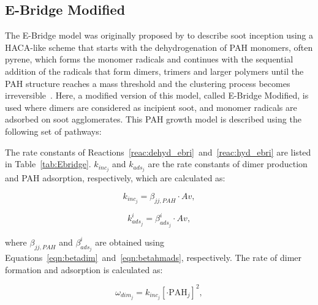 \subsection{E-Bridge Modified}
\label{sec:ebrimod}
The E-Bridge model was originally proposed by \citet{frenklach2020mechanism} to describe soot inception using a HACA-like scheme that starts with the dehydrogenation of PAH monomers, often pyrene, which forms the monomer radicals and continues with the sequential addition of the radicals that form dimers, trimers and larger polymers until the PAH structure reaches a mass threshold and the clustering process becomes irreversible~\citep{frenklach2020mechanism}. Here, a modified version of this model, called E-Bridge Modified, is used where dimers are considered as incipient soot, and monomer radicals are adsorbed on soot agglomerates. This PAH growth model is described using the following set of pathways:




The rate constants of Reactions~\eqref{reac:dehyd_ebri}~and~\eqref{reac:hyd_ebri} are listed in Table~\ref{tab:Ebridge}. $k_{inc_j}$ and $k_{ads_j}$ are the rate constants of dimer production and PAH adsorption, respectively, which are calculated as:

\begin{equation}
	k_{inc_j}=
	\beta_{jj,PAH}\cdot Av
	\label{eqn:kdim_ebri},
\end{equation}

\begin{equation}
	k^i_{ads_{j}}=
	\beta^i_{ads_j}\cdot Av
	\label{eqn:kads_ebir},
\end{equation}

\noindent where $\beta_{jj,PAH}$ and $\beta^i_{ads_j}$ are obtained using Equations~\eqref{eqn:betadim}~and~\eqref{eqn:betahmads}, respectively. The rate of dimer formation and adsorption is calculated as:

\begin{equation}
	\omega_{dim_j} = k_{inc_{j}} [\mathrm{\cdot{PAH}}_j]^2,
	\label{eqn:wdim_ebri}
\end{equation}

